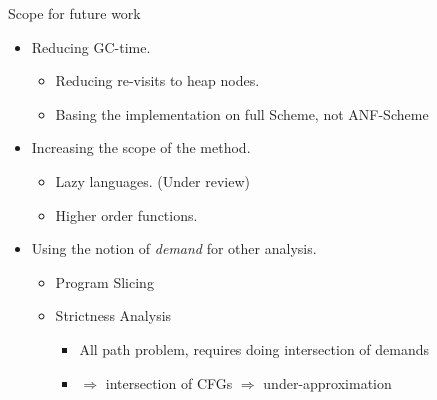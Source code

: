 \documentclass[xcolor=x11names,compress,mathserif]{beamer}
\renewcommand{\(}{\begin{columns}}
\renewcommand{\)}{\end{columns}}
\newcommand{\<}[1]{\begin{column}{#1}}
\renewcommand{\>}{\end{column}}
\begin{document}
\begin{frame}{Scope for future work}
\normalsize
\begin{itemize}\itemsep2em
\item<1-> Reducing GC-time.
  \begin{itemize}
  \item Reducing re-visits to heap nodes.
  \item Basing the implementation on full Scheme, not ANF-Scheme
  \end{itemize}
\item<2-> Increasing the scope of the method.
  \begin{itemize}
  \item Lazy languages. (Under review)
  \item Higher order functions.
  \end{itemize}
\item<3-> Using the notion of {\em demand} for other analysis.
  \begin{itemize}
  \item Program Slicing
  \item Strictness Analysis
    \begin{itemize}
    \item All path problem, requires doing intersection of demands 
    \item $\Rightarrow$ intersection of CFGs $\Rightarrow$ under-approximation
    \end{itemize}
  \end{itemize}
\end{itemize}
\end{frame}

\end{document}
